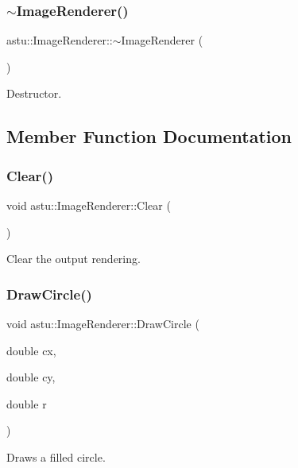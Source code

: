 \subsubsection{\texorpdfstring{$\sim$\+Image\+Renderer()}{~ImageRenderer()}}
{\footnotesize\ttfamily astu\+::\+Image\+Renderer\+::$\sim$\+Image\+Renderer (\begin{DoxyParamCaption}{ }\end{DoxyParamCaption})}

Destructor. 

\subsection{Member Function Documentation}
\mbox{\label{classastu_1_1ImageRenderer_ae81b23f9e19254a7923cadf2a9e081a3}} 
\subsubsection{\texorpdfstring{Clear()}{Clear()}}
{\footnotesize\ttfamily void astu\+::\+Image\+Renderer\+::\+Clear (\begin{DoxyParamCaption}{ }\end{DoxyParamCaption})}

Clear the output rendering. \mbox{\label{classastu_1_1ImageRenderer_a903b1b78edee5f09b9ee1f604d762c28}} 
\subsubsection{\texorpdfstring{Draw\+Circle()}{DrawCircle()}\hspace{0.1cm}{\footnotesize\ttfamily [1/2]}}
{\footnotesize\ttfamily void astu\+::\+Image\+Renderer\+::\+Draw\+Circle (\begin{DoxyParamCaption}\item[{double}]{cx,  }\item[{double}]{cy,  }\item[{double}]{r }\end{DoxyParamCaption})}

Draws a filled circle.


